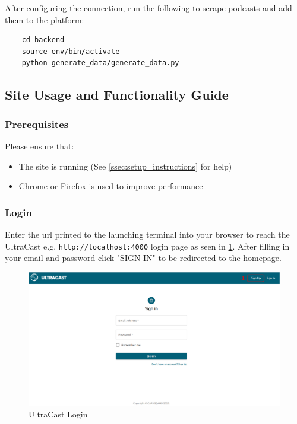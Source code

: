 \documentclass[../report.tex]{subfiles}
\begin{document}
After configuring the connection, run the following to scrape podcasts and add them to the platform:

\begin{verbatim}
    cd backend
    source env/bin/activate
    python generate_data/generate_data.py
\end{verbatim}

\newpage

\subsection{Site Usage and Functionality Guide}

\subsubsection{Prerequisites}

Please ensure that:
\begin{itemize}
    \item The site is running (See \cref{ssec:setup_instructions} for help)
    \item Chrome or Firefox is used to improve performance
\end{itemize}

\subsubsection{Login}

Enter the url printed to the launching terminal into your browser to reach the UltraCast e.g. \verb|http://localhost:4000|
login page as seen in \cref{fig:UM_Login}. After filling in your email and password 
click "SIGN IN" to be redirected to the homepage.
%
\begin{figure}[ht] 
    \centering
    \includegraphics[width=16cm]{resources/UM_Login}
    \caption{UltraCast Login}
    \label{fig:UM_Login} 
\end{figure}
\end{document}
